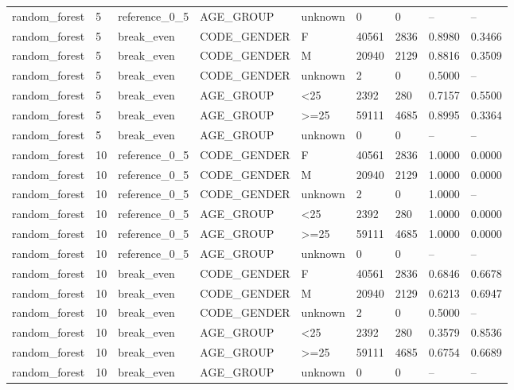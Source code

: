 \begin{longtable}{lllllllll}
random\_forest & 5 & reference\_0\_5 & AGE\_GROUP & unknown & 0 & 0 & -- & -- \\
random\_forest & 5 & break\_even & CODE\_GENDER & F & 40561 & 2836 & 0.8980 & 0.3466 \\
random\_forest & 5 & break\_even & CODE\_GENDER & M & 20940 & 2129 & 0.8816 & 0.3509 \\
random\_forest & 5 & break\_even & CODE\_GENDER & unknown & 2 & 0 & 0.5000 & -- \\
random\_forest & 5 & break\_even & AGE\_GROUP & <25 & 2392 & 280 & 0.7157 & 0.5500 \\
random\_forest & 5 & break\_even & AGE\_GROUP & >=25 & 59111 & 4685 & 0.8995 & 0.3364 \\
random\_forest & 5 & break\_even & AGE\_GROUP & unknown & 0 & 0 & -- & -- \\
random\_forest & 10 & reference\_0\_5 & CODE\_GENDER & F & 40561 & 2836 & 1.0000 & 0.0000 \\
random\_forest & 10 & reference\_0\_5 & CODE\_GENDER & M & 20940 & 2129 & 1.0000 & 0.0000 \\
random\_forest & 10 & reference\_0\_5 & CODE\_GENDER & unknown & 2 & 0 & 1.0000 & -- \\
random\_forest & 10 & reference\_0\_5 & AGE\_GROUP & <25 & 2392 & 280 & 1.0000 & 0.0000 \\
random\_forest & 10 & reference\_0\_5 & AGE\_GROUP & >=25 & 59111 & 4685 & 1.0000 & 0.0000 \\
random\_forest & 10 & reference\_0\_5 & AGE\_GROUP & unknown & 0 & 0 & -- & -- \\
random\_forest & 10 & break\_even & CODE\_GENDER & F & 40561 & 2836 & 0.6846 & 0.6678 \\
random\_forest & 10 & break\_even & CODE\_GENDER & M & 20940 & 2129 & 0.6213 & 0.6947 \\
random\_forest & 10 & break\_even & CODE\_GENDER & unknown & 2 & 0 & 0.5000 & -- \\
random\_forest & 10 & break\_even & AGE\_GROUP & <25 & 2392 & 280 & 0.3579 & 0.8536 \\
random\_forest & 10 & break\_even & AGE\_GROUP & >=25 & 59111 & 4685 & 0.6754 & 0.6689 \\
random\_forest & 10 & break\_even & AGE\_GROUP & unknown & 0 & 0 & -- & -- \\
\bottomrule
\end{longtable}
